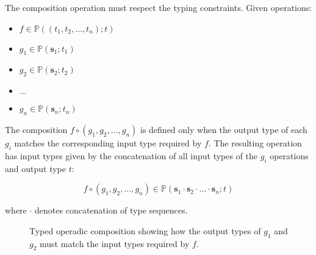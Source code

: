 The composition operation must respect the typing constraints. Given operations:
\begin{itemize}
  \item $f \in \mathbb{P}((t_1, t_2, \ldots, t_n); t)$
  \item $g_1 \in \mathbb{P}(\mathbf{s}_1; t_1)$
  \item $g_2 \in \mathbb{P}(\mathbf{s}_2; t_2)$
  \item $\ldots$
  \item $g_n \in \mathbb{P}(\mathbf{s}_n; t_n)$
\end{itemize}

The composition $f \circ (g_1, g_2, \ldots, g_n)$ is defined only when the output type of each $g_i$ matches the corresponding input type required by $f$. The resulting operation has input types given by the concatenation of all input types of the $g_i$ operations and output type $t$:

\begin{equation}
  f \circ (g_1, g_2, \ldots, g_n) \in \mathbb{P}(\mathbf{s}_1 \cdot \mathbf{s}_2 \cdot \ldots \cdot \mathbf{s}_n; t)
\end{equation}

where $\cdot$ denotes concatenation of type sequences.

\begin{figure}[h]
\centering
{}
\caption{Typed operadic composition showing how the output types of $g_1$ and $g_2$ must match the input types required by $f$.}
\label{fig:typed-operadic-composition}
\end{figure}

